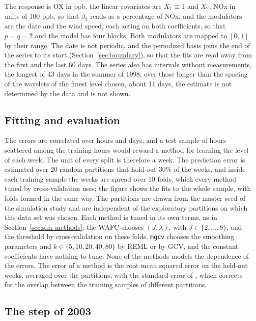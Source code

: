 \documentclass[12pt]{article} %
\theoremstyle{definition}
\theoremstyle{plain}
\newcommand{\pen}{\lambda}
\begin{document}
{The response is OX in ppb, the linear covariates are $X_1 \equiv 1$ and
$X_2$, NOx in units of 100 ppb, so that $\beta_2$ reads as a percentage of
NOx, and the modulators are the date and the wind speed, each acting on both
coefficients, so that $p = q = 2$ and the model has four blocks. Both
modulators are mapped to $[0,1]$ by their range. The date is not periodic, and
the periodized basis joins the end of the series to its start
(Section~\ref{sec:boundary}), so that the fits are read away from the first
and the last 60 days. The series also has intervals without measurements,
the longest of 43 days in the summer of 1998; over those longer than the
spacing of the wavelets of the finest level chosen, about 11 days, the
estimate is not determined by the data and is not shown.

\subsection{Fitting and evaluation}
\label{sec:app-fit}

The errors are correlated over hours and days, and a test sample of hours
scattered among the training hours would reward a method for learning the
level of each week. The unit of every split is therefore a week. The
prediction error is estimated over 20 random partitions that hold out 30\% of
the weeks, and inside each training sample the weeks are spread over 10
folds, which every method tuned by cross-validation uses; the figure shows
the fits to the whole sample, with folds formed in the same way. The
partitions are drawn from the master seed of the simulation study and are
independent of the exploratory partitions on which this data set was chosen.
Each method is tuned in its own terms, as in Section~\ref{sec:sim-methods}:
the WAFC chooses $(J,\pen)$, with $J \in \{2,\dots,8\}$, and the threshold by
cross-validation on these folds, \texttt{mgcv} chooses the smoothing
parameters and $k \in \{5,10,20,40,80\}$ by REML or by GCV, and the constant
coefficients have nothing to tune. None of the methods models the dependence
of the errors. The error of a method is the root mean squared error on the
held-out weeks, averaged over the partitions, with the standard error of
\citet{Nadeau-Bengio-2003}, which corrects for the overlap between the
training samples of different partitions.

\subsection{The step of 2003}
\label{sec:app-step}

}
\end{document}
